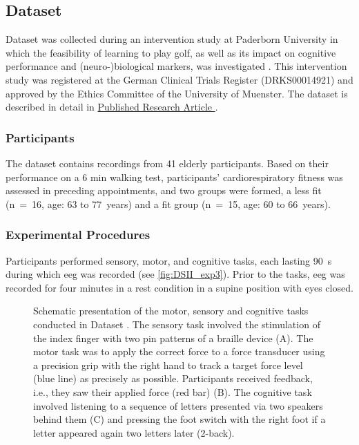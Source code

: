 \subsection{Dataset }
\label{methods:datasets:III}
Dataset  was collected during an intervention study at Paderborn University in which the feasibility of learning to play golf, as well as its impact on cognitive performance and (neuro-)biological markers, was investigated \cite{Ströhlein2020,Stroehlein2021,Gowik2023}. This intervention study was registered at the German Clinical Trials Register (DRKS00014921) and approved by the Ethics Committee of the University of Muenster. The dataset is described in detail in \hyperref[pub:paperIII]{Published Research Article }. 

\subsubsection{Participants}
\label{methods:datasets:III:participants}
The dataset contains recordings from 41 elderly participants. Based on their performance on a 6 min walking test, participants’ cardiorespiratory fitness was assessed in preceding appointments, and two groups were formed, a less fit (n~=~16, age: 63 to 77~years) and a fit group (n~=~15, age: 60 to 66~years).

\subsubsection{Experimental Procedures}
\label{methods:datasets:III:experiment}
Participants performed sensory, motor, and cognitive tasks, each lasting 90~s during which \gls{eeg} was recorded (see \autoref{fig:DSII_exp3}). Prior to the tasks, \gls{eeg} was recorded for four minutes in a rest condition in a supine position with eyes closed.

\begin{figure}[h]
\begin{center}

\captionsetup{justification=justified}
\caption[Schematic presentation of the motor, sensory and cognitive tasks conducted in Dataset ]{Schematic presentation of the motor, sensory and cognitive tasks conducted in Dataset . The sensory task involved the stimulation of the index finger with two pin patterns of a braille device (A). The motor task was to apply the correct force to a force transducer using a precision grip with the right hand to track a target force level (blue line) as precisely as possible. Participants received feedback, i.e., they saw their applied force (red bar) (B). The cognitive task involved listening to a sequence of letters presented via two speakers behind them (C) and pressing the foot switch with the right foot if a letter appeared again two letters later (2-back).}
\label{fig:DSII_exp3}
\end{center}
\end{figure}

